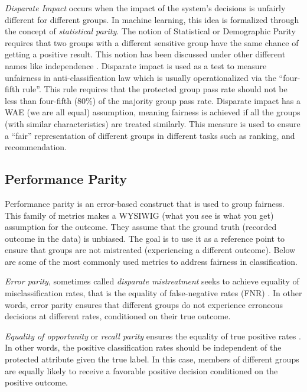         \textit{Disparate Impact} \cite{Feldman2015} occurs when the impact of the system's decisions is unfairly different for different groups. In machine learning, this idea is formalized through the concept of \textit{statistical parity}. The notion of Statistical or Demographic Parity requires that two groups with a different sensitive group have the same chance of getting a positive result. This notion has been discussed under other different names like independence \cite{barocas2018fairness}. Disparate impact is used as a test to measure unfairness in anti-classification law\cite{corbett2018measure} which is usually operationalized via the ``four-fifth rule''. This rule requires that the protected group pass rate should not be less than four-fifth (80\%) of the majority group pass rate. Disparate impact has a WAE (we are all equal) assumption, meaning fairness is achieved if all the groups (with similar characteristics) are treated similarly. This measure is used to ensure a ``fair'' representation of different groups in different tasks such as ranking\cite{singh2018fairness,zehlike2017fa,yang2017measuring}, and recommendation\cite{mehtora2018towards,ekstrand2018exploring}.
    
    
    \subsection{Performance Parity}
        Performance parity is an error-based construct that is used to group fairness. This family of metrics makes a WYSIWIG (what you see is what you get) assumption for the outcome. They assume that the ground truth (recorded outcome in the data) is unbiased. The goal is to use it as a reference point to ensure that groups are not mistreated (experiencing a different outcome). Below are some of the most commonly used metrics to address fairness in classification.
        
        \textit{Error parity}, sometimes called \textit{disparate mistreatment} seeks to achieve equality of misclassification rates, that is the equality of false-negative rates (FNR) \cite{zafar2017fairness}. In other words, error parity ensures that different groups do not experience erroneous decisions at different rates, conditioned on their true outcome.
        
        \textit{Equality of opportunity} or \textit{recall parity} ensures the equality of true positive rates \cite{hardt2016equality}. In other words, the positive classification rates should be independent of the protected attribute given the true label. In this case, members of different groups are equally likely to receive a favorable positive decision conditioned on the positive outcome.
        

